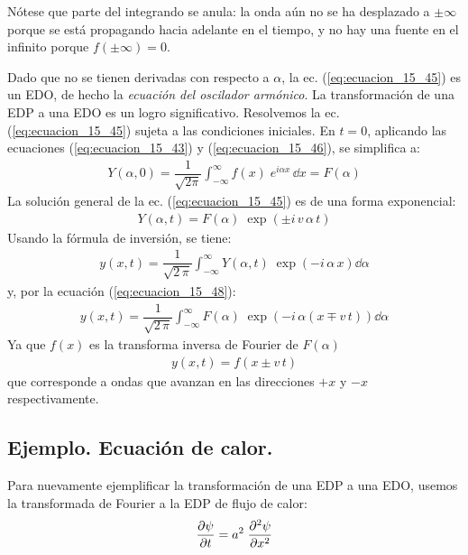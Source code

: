 Nótese que parte del integrando se anula: la onda aún no se ha desplazado a $\pm \infty$ porque se está propagando hacia adelante en el tiempo, y no hay una fuente en el infinito porque $f(\pm \infty) = 0$.
\par
Dado que no se tienen derivadas con respecto a $\alpha$, la ec. (\ref{eq:ecuacion_15_45}) es un EDO, de hecho la \emph{ecuación del oscilador armónico}. La transformación de una EDP a una EDO es un logro significativo. Resolvemos la ec. (\ref{eq:ecuacion_15_45}) sujeta a las condiciones iniciales. En $t=0$, aplicando las ecuaciones (\ref{eq:ecuacion_15_43}) y (\ref{eq:ecuacion_15_46}), se simplifica a:
\begin{align}
Y(\alpha, 0) = \dfrac{1}{\sqrt{2 \pi}} \int_{-\infty}^{\infty} f(x) \; e^{i \alpha x} \, \dd x =  F(\alpha)
\label{eq:ecuacion_15_47}
\end{align}
La solución general de la ec. (\ref{eq:ecuacion_15_45}) es de una forma exponencial:
\begin{align}
Y(\alpha, t) = F(\alpha) \; \exp(\pm  i \, v \, \alpha \, t)
\label{eq:ecuacion_15_48}
\end{align}
Usando la fórmula de inversión, se tiene:
\begin{align}
y(x,t) = \dfrac{1}{\sqrt{2 \, \pi}} \int_{-\infty}^{\infty} Y(\alpha, t) \; \exp(-i \, \alpha \, x) \dd{\alpha}
\label{eq:ecuacion_15_49}
\end{align}
y, por la ecuación (\ref{eq:ecuacion_15_48}):
\begin{align}
y(x, t) = \dfrac{1}{\sqrt{2 \, \pi}} \int_{-\infty}^{\infty} F(\alpha) \; \exp(- i \, \alpha (x \mp v \, t)) \dd{\alpha}
\label{eq:ecuacion_15_50}
\end{align}
Ya que $f(x)$ es la transforma inversa de Fourier de $F(\alpha)$
\begin{align}
y(x, t) = f (x \pm v \, t)
\label{eq:ecuacion_15_51}
\end{align}
que corresponde a ondas que avanzan en las direcciones $+x$ y $-x$ respectivamente.

\subsection*{Ejemplo. Ecuación de calor.}

Para nuevamente ejemplificar la transformación de una EDP a una EDO, usemos la transformada de Fourier a la EDP de flujo de calor:
\begin{align*}
\pdv{\psi}{t} = a^{2} \; \pdv[2]{\psi}{x}
\end{align*}

